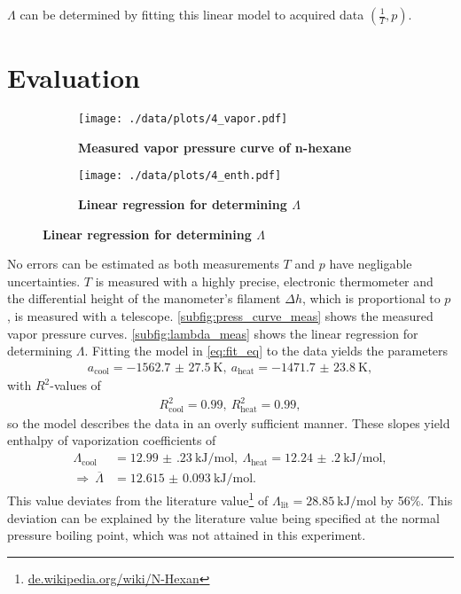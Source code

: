 $\Lambda$ can be determined by fitting this linear model to acquired data $(\frac{1}{T},p)$.

\section{Evaluation}
\begin{figure}[tbp]
	\centering
	\begin{subfigure}{0.4\textwidth}
		\centering
		\texttt{[image: ./data/plots/4\_vapor.pdf]}
		\caption{\textbf{Measured vapor pressure curve of n-hexane}}
		\label{subfig:press_curve_meas}
	\end{subfigure}
	\begin{subfigure}{0.4\textwidth}
		\centering
		\texttt{[image: ./data/plots/4\_enth.pdf]}
		\caption{\textbf{Linear regression for determining $\Lambda$}}
		\label{subfig:lambda_meas}
	\end{subfigure}
\end{figure}

No errors can be estimated as both measurements $T$ and $p$ have negligable uncertainties.
$T$ is measured with a highly precise, electronic thermometer and the differential height of the manometer's filament $\Delta h$, which is proportional to $p$, is measured with a telescope.
\autoref{subfig:press_curve_meas} shows the measured vapor pressure curves.
\autoref{subfig:lambda_meas} shows the linear regression for determining $\Lambda$.
Fitting the model in \autoref{eq:fit_eq} to the data yields the parameters
\begin{align*}
	a_\text{cool}=\SI{-1562.7(275)}{\kelvin},\ a_\text{heat}=\SI{-1471.7(238)}{\kelvin},
\end{align*}
with $R^2$-values of
\begin{align*}
	R^2_\text{cool}=\num{0.99},\ R^2_\text{heat}=\num{0.99},
\end{align*}
so the model describes the data in an overly sufficient manner.
These slopes yield enthalpy of vaporization coefficients of
\begin{align*}
	\Lambda_\text{cool}&=\SI{12.99(23)}{\kilo\joule\per\mole},\ \Lambda_\text{heat}=\SI{12.24(20)}{\kilo\joule\per\mole}, \\
	\Rightarrow\ \overline{\Lambda}&=\SI{12.615(93)}{\kilo\joule\per\mole}.
\end{align*}
This value deviates from the literature value\footnote{\url{de.wikipedia.org/wiki/N-Hexan}} of $\Lambda_\text{lit}=\SI{28.85}{\kilo\joule\per\mole}$ by \num{56}\%.
This deviation can be explained by the literature value being specified at the normal pressure boiling point, which was not attained in this experiment.
